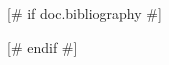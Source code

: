 \documentclass[qe,nameyear,draft]{econsocart}
[# else #]
\theoremstyle{plain}
\theoremstyle{remark}
\begin{document}


[# if doc.bibliography #]

[# endif #]

\end{document}
